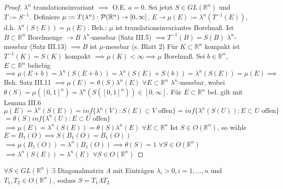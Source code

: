     \begin{proof}
	$\lambda^n$ translationsinvariant $\implies$ O.E. $a=0$. \newline
	Sei jetzt $S\in GL(\mathbb{R}^n)$ und $T:=S^{-1}$. \newline
	Definiere $\mu := T(\lambda^n): \mathcal{P}(\mathbb{R}^n) \rightarrow [0,\infty]$, $E \to \mu(E) := \lambda^n(T^{-1}(E))$, d.h.\newline
	$\lambda^n(S(E)) = \mu(E)$. \newline
	Beh.: $\mu$ ist translationsinvariantes Borelmaß. \newline
	Ist $B\subset\mathbb{R}^n$ Borelmenge $\rightarrow B$ $\lambda^n$-messbar (Satz III.5) $\implies T^{-1}(B) = S(B)$ $\lambda^n$-messbar (Satz III.13) $\implies B$ ist $\mu$-messbar (s. Blatt 2) \newline
	Für $K\subset\mathbb{R}^n$ kompakt ist $T^{-1}(K) = S(K)$ kompakt $\implies \mu(K) < \infty \implies \mu$ Borelmaß. \newline
	Sei $b\in\mathbb{R}^n$, $E\subset\mathbb{R}^n$ beliebig \newline 
	$\implies \mu(E+b) = \lambda^n(S(E+b)) = \lambda^n(S(E) + S(b)) = \lambda^n(S(E)) = \mu(E) \implies$ Beh. \newline
	Satz III.11 $\implies \mu(E) = \theta(S) \lambda^n(E)$ $\forall E\subset\mathbb{R}^n$ $\lambda^n$-messbar, wobei $\theta(S) = \mu([0,1]^n) = \lambda^n(S([0,1]^n)) \in [0,\infty]$. \newline
	Für $E\subset\mathbb{R}^n$ bel. gilt mit Lemma III.6 \newline
	$\mu(E) = \lambda^n(S(E)) = inf\{\lambda^n(V): S(E)\subset V \text{ offen}\} = inf\{\lambda^n(S(U)): E\subset U \text{ offen}\}$ \newline $= \theta(S) inf\{\lambda^n(U): E\subset U \text{ offen}\}$ \newline
	$\implies \mu(E) = \lambda^n(S(E)) = \theta(S) \lambda^n(E)$ $\forall E\subset\mathbb{R}^n$ \newline
	Ist $S\in O(\mathbb{R}^n)$, so wähle $E = B_1(O) \implies S(B_1(O) = B_1(O))$ \newline
	$\implies \mu(B_1(O)) = \lambda^n(B_1(O)) \implies \theta(S) = 1$ $\forall S\in O(\mathbb{R}^n)$ \newline
	$\implies \lambda^n(S(E)) = \lambda^n(E)$ $\forall S \in O(\mathbb{R}^n)$
\end{proof}

  \begin{lemma}[Polarzerlegung]
    $\forall S \in GL(\mathbb{R}^n) \ \exists$ Diagonalmatrix $\Lambda$ mit Einträgen $\lambda_i > 0, i=1,...,n$ und \\
    $T_1, T_2 \in O(\mathbb{R}^n)$, sodass $S = T_1 \Lambda T_2$ 
  \end{lemma}

